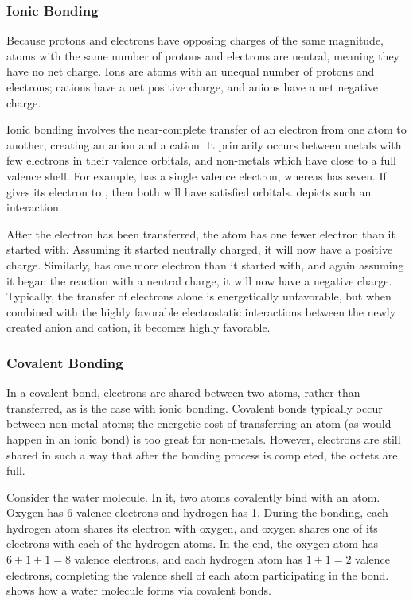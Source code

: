 \subsubsection{Ionic Bonding}

Because protons and electrons have opposing charges of the same magnitude, atoms with the same number of protons and electrons are neutral, meaning they have no net charge. Ions are atoms with an unequal number of protons and electrons; cations have a net positive charge, and anions have a net negative charge.

Ionic bonding involves the near-complete transfer of an electron from one atom to another, creating an anion and a cation. It primarily occurs between metals with few electrons in their valence orbitals, and non-metals which have close to a full valence shell. For example,  has a single valence electron, whereas  has seven. If  gives its electron to , then both will have satisfied orbitals.  depicts such an interaction.

After the electron has been transferred, the  atom has one fewer electron than it started with. Assuming it started neutrally charged, it will now have a positive charge. Similarly,  has one more electron than it started with, and again assuming it began the reaction with a neutral charge, it will now have a negative charge. Typically, the transfer of electrons alone is energetically unfavorable, but when combined with the highly favorable electrostatic interactions between the newly created anion and cation, it becomes highly favorable.

\subsubsection{Covalent Bonding}

In a covalent bond, electrons are shared between two atoms, rather than transferred, as is the case with ionic bonding. Covalent bonds typically occur between non-metal atoms; the energetic cost of transferring an atom (as would happen in an ionic bond) is too great for non-metals. However, electrons are still shared in such a way that after the bonding process is completed, the octets are full.

Consider the water molecule. In it, two  atoms covalently bind with an  atom. Oxygen has \num{6} valence electrons and hydrogen has \num{1}. During the bonding, each hydrogen atom shares its electron with oxygen, and oxygen shares one of its electrons with each of the hydrogen atoms. In the end, the oxygen atom has \(6+1+1=8\) valence electrons, and each hydrogen atom has \(1+1=2\) valence electrons, completing the valence shell of each atom participating in the bond.  shows how a water molecule forms via covalent bonds.

